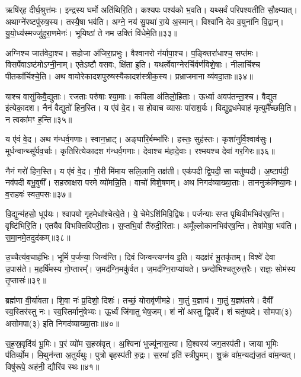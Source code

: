 ऋषि॑र्‌ह दीर्घ॒श्रुत्त॑मः। इन्द्रस्य घर्मो अति॑थिरि॒ति। 
कश्यपः पश्य॑को भ॒वति। यथ्सर्वं परिपश्यती॑ति सौ॒क्ष्म्यात्। 
अथाग्ने॑रष्टपु॑रुष॒स्य। तस्यै॒षा भव॑ति। 
अग्ने॒ नय॑ सु॒पथा॑ रा॒ये अ॒स्मान्। विश्वा॑नि देव व॒युना॑नि वि॒द्वान्। 
यु॒यो॒ध्य॑स्मज्जु॑हुरा॒णमेनः॑। भूयिष्ठां ते नम उक्तिं वि॑धेमे॒ति॥३३॥\ip\anuvakamend


अग्निश्च जात॑वेदा॒श्च। सहोजा अ॑जिरा॒प्रभुः। वैश्वानरो न॑र्यापा॒श्च। 
प॒ङ्क्तिरा॑धाश्च॒ सप्त॑मः। विसर्पेवा\-ऽष्ट॑मो\-ऽग्नी॒नाम्। 
एते\-ऽष्टौ वसवः, क्षि॑ता इ॒ति। यथर्त्वेवाग्नेरर्चिर्वर्ण॑विशे॒षाः। 
नीलार्चिश्च पीतका᳚र्चिश्चे॒ति। अथ वायोरेकादश\-पुरुषस्यैका\-दश॑स्त्रीक॒स्य। 
प्रभ्राजमाना व्य॑वदा॒ताः॥३४॥\ip


याश्च वासु॑किवै॒द्युताः। रजताः परु॑षाः श्या॒माः। कपिला अ॑तिलो॒हिताः। 
ऊर्ध्वा अवप॑तन्ता॒श्च। वैद्युत इ॑त्येका॒दश। नैनं वैद्युतो॑ हिन॒स्ति। 
य ए॑वं वे॒द। स होवाच व्यासः पा॑राश॒र्यः। 
विद्युद्वधमेवाहं मृत्युमै᳚च्छमि॒ति। न त्वका॑मꣳ ह॒न्ति॥३५॥\ip


य ए॑वं वे॒द। अथ ग॑न्धर्व॒गणाः। स्वान॒भ्राट्। 
अङ्घा॑रि॒र्बम्भा॑रिः। हस्तः॒ सुह॑स्तः। कृशा॑नुर्वि॒श्वाव॑सुः। 
मूर्धन्वान्थ्सू᳚र्यव॒र्चाः। कृतिरित्येका\-दश ग॑न्धर्व॒\-गणाः। 
देवाश्च म॑हादे॒वाः। रश्मयश्च देवा॑ गर॒गिरः॥३६॥\ip


नैनं गरो॑ हिन॒स्ति। य ए॑वं वे॒द। 
गौ॒री मि॑माय सलि॒लानि॒ तक्ष॑ती। एक॑पदी द्वि॒पदी॒ सा चतु॑ष्पदी। 
अ॒ष्टाप॑दी॒ नव॑पदी बभू॒वुषी᳚। सहस्राक्षरा परमे व्यो॑मन्नि॒ति। 
वाचो॑ विशे॒षणम्। अथ निगद॑व्याख्या॒ताः। 
ताननुक्र॑मिष्या॒मः। व॒राहवः॑ स्वत॒पसः॥३७॥\ip

वि॒द्युन्म॑हसो॒ धूप॑यः। श्वापयो गृहमेधा᳚श्चेत्ये॒ते। 
ये॒ चेमे\-ऽशि॑मिवि॒\-द्विषः। पर्जन्याः सप्त पृथिवीमभिव॑र्‌ष॒न्ति। 
वृष्टि॑भिरि॒ति। एतयैव विभक्तिवि॑परी॒ताः। स॒प्तभि॒र्वा तै॑रुदी॒रिताः। 
अमूँल्लोकान\-भिव॑र्‌ष॒न्ति। तेषा॑मेषा॒ भव॑ति। स॒मा॒न\-मे॒त\-दुद॑कम्॥३८॥\ip

उ॒च्चैत्य॑व॒चाह॑भिः। भूमिं॑ प॒र्जन्या॒ जिन्व॑न्ति। दिवं जिन्वन्त्यग्न॑य इ॒ति। 
यदक्ष॑रं भू॒तकृ॑तम्। विश्वे॑ देवा उ॒पास॑ते। म॒हर्\mbox{}षि॑मस्य गो॒प्तारम्᳚। 
ज॒मद॑ग्नि॒मकु॑र्वत। ज॒मद॑ग्नि॒\-राप्या॑यते। 
छन्दो॑भिश्चतुरुत्त॒रैः। राज्ञः॒ सोम॑स्य तृ॒प्तासः॑॥३९॥\ip

ब्रह्म॑णा वी॒र्या॑वता। शि॒वा नः॑ प्र॒दिशो॒ दिशः॑। 
तच्छं॒ योरावृ॑णीमहे। गा॒तुं य॒ज्ञाय॑। गा॒तुं य॒ज्ञप॑तये। 
दैवी᳚ स्व॒स्तिर॑स्तु नः। स्व॒स्तिर्मानु॑षेभ्यः। ऊ॒र्ध्वं जि॑गातु भेष॒जम्। 
शं नो॑ अस्तु द्वि॒पदे᳚। शं चतु॑ष्पदे। 
सोमपा(३) असोमपा(३) इति निगद॑व्याख्या॒ताः॥४०॥\ip\anuvakamend


स॒ह॒स्र॒वृदि॑यं भू॒मिः। प॒रं व्यो॑म स॒हस्र॑वृत्। अ॒श्विना॑ भुज्यू॑नास॒त्या। 
वि॒श्वस्य॑ जग॒तस्प॑ती। जाया भूमिः प॑तिर्व्यो॒म। मि॒थुन॑न्ता अ॒तुर्य॑थुः। 
पुत्रो बृहस्प॑ती रु॒द्रः। स॒रमा॑ इति॑ स्त्रीपु॒मम्। 
शु॒क्रं वा॑म॒न्यद्य॑ज॒तं वा॑म॒न्यत्। विषु॑रूपे॒ अह॑नी॒ द्यौरि॑व स्थः॥४१॥\ip



